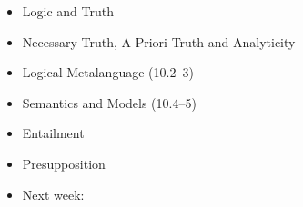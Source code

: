 \documentclass[headrule,footrule]{foils}
\begin{document}
\MyLogo{}
\begin{itemize}\addtolength{\itemsep}{-1ex}
\item Logic and Truth
\item Necessary Truth, A Priori Truth and Analyticity
\item Logical Metalanguage (10.2--3)
\item Semantics and Models (10.4--5)
\item Entailment
\item Presupposition
\item Next week: 

\end{itemize}

\small



\clearpage
\end{document}
